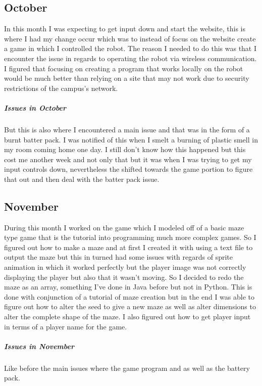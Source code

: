 \documentclass[13ptletterpaper]{paper}
\newcommand\tab[1][1cm]{\hspace*{#1}}
\begin{document}
\begin{flushleft}
		\subsection{October} 
		\tab In this month I was expecting to get input down and start the website, this is where I had my change occur which was to instead of focus on the website create a game in which I controlled the robot. The reason I needed to do this was that I encounter the issue in regards to operating the robot via wireless communication. I figured that focusing on creating a program that works locally on the robot would be much better than relying on a site that may not work due to security restrictions of the campus's network. 
		\subparagraph{Issues in October} But this is also where I encountered a main issue and that was in the form of a burnt batter pack. I was notified of this when I smelt a burning of plastic smell in my room coming home one day. I still don't know how this happened but this cost me another week and not only that but it was when I was trying to get my input controls down, nevertheless the shifted towards the game portion to figure that out and then deal with the batter pack issue.
		\subsection{November} 
		\tab During this month I worked on the game which I modeled off of a basic maze type game that is the tutorial into programming much more complex games. So I figured out how to make a maze and at first I created it with using a text file to output the maze but this in turned had some issues with regards of sprite animation in which it worked perfectly but the player image was not correctly displaying the player but also that it wasn't moving. So I decided to redo the maze as an array, something I've done in Java before but not in Python. This is done with conjunction of a tutorial of maze creation but in the end I was able to figure out how to alter the seed to give a new maze as well as alter dimensions to alter the complete shape of the maze. I also figured out how to get player input in terms of a player name for the game.
		\subparagraph{Issues in November}Like before the main issues where the game program and as well as the battery pack. 

\end{flushleft}
\end{document}

